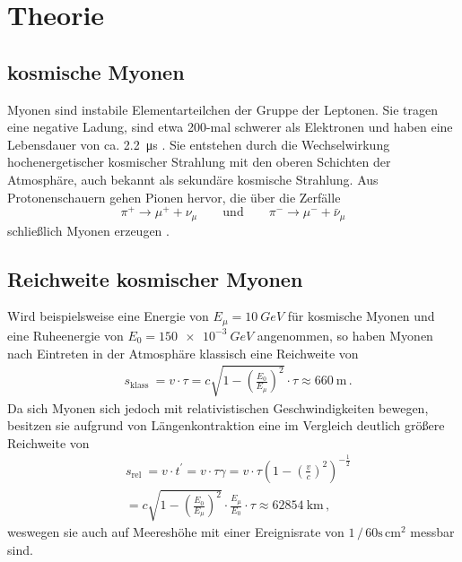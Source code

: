 \section{Theorie}
\label{sec:Theorie}

\subsection{kosmische Myonen}
\label{subsec:kosmische Myonen}

Myonen sind instabile Elementarteilchen der Gruppe der Leptonen. 
Sie tragen eine negative Ladung, sind etwa 200-mal schwerer als Elektronen 
und haben eine Lebensdauer von ca. \qty{2,2}{\micro\second} \cite[125]{grupen}.
Sie entstehen durch die Wechselwirkung hochenergetischer kosmischer Strahlung
mit den oberen Schichten der Atmosphäre,
auch bekannt als sekundäre kosmische Strahlung.
Aus Protonenschauern gehen Pionen hervor,
die über die Zerfälle
\begin{equation*}
    \pi^{+} \rightarrow \mu^{+}+\nu_\mu \qquad \text {und} \qquad \pi^{-} \rightarrow \mu^{-}+\bar{\nu}_\mu
\end{equation*}
schließlich Myonen erzeugen \cite{demtroeder4}.


\subsection{Reichweite kosmischer Myonen}
\label{subsec:Reichweite kosmischer Myonen}

Wird beispielsweise eine Energie von $E_\mu = \qty{10}{GeV}$ für kosmische Myonen 
und eine Ruheenergie von $E_0 = \qty{150e-3}{GeV}$ angenommen,
so haben Myonen nach Eintreten in der Atmosphäre klassisch eine Reichweite von
\begin{equation}
    \begin{aligned}
    & s_{\text {klass }}=v \cdot \tau=c \sqrt{1-\left(\frac{E_0}{E_\mu}\right)^2} \cdot \tau \approx 660 \mathrm{~m} \, .
    \end{aligned}
\end{equation}
Da sich Myonen sich jedoch mit relativistischen Geschwindigkeiten bewegen,
besitzen sie aufgrund von Längenkontraktion eine im Vergleich deutlich größere Reichweite von 
\begin{equation}
    \begin{aligned}
    & s_{\text {rel }}=v \cdot t^{\prime}=v \cdot \tau \gamma=v \cdot \tau\left(1-\left(\frac{v}{c}\right)^2\right)^{-\frac{1}{2}} \\
    & =c \sqrt{1-\left(\frac{E_0}{E_\mu}\right)^2} \cdot \frac{E_\mu}{E_0} \cdot \tau \approx 62854 \mathrm{~km} \, ,
    \end{aligned}
\end{equation}
weswegen sie auch auf Meereshöhe mit einer Ereignisrate von $1 \, / \, 60\text{s} \, \text{cm}^2$ \cite[208]{grupen} messbar sind.


